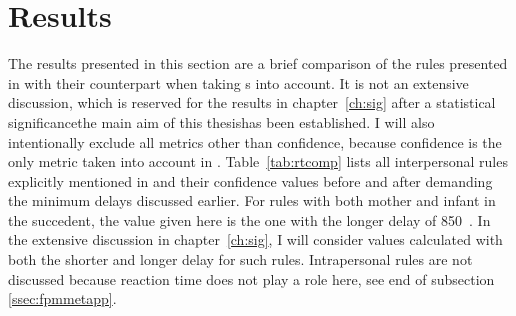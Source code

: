 \section{Results}
\label{sec:fpmres}
The results presented in this section are a brief comparison of the rules presented in \citet{rohlfing_multimodal_underreview} with their counterpart when taking \rt s into account.
It is not an extensive discussion, which is reserved for the results in chapter~\ref{ch:sig} after a statistical significance\dash the main aim of this thesis\dash has been established.
I will also intentionally exclude all metrics other than confidence, because confidence is the only metric taken into account in \citet{rohlfing_multimodal_underreview}.
Table~\ref{tab:rtcomp} lists all interpersonal rules explicitly mentioned in \citet{rohlfing_multimodal_underreview} and their confidence values before and after demanding the minimum delays discussed earlier.
For rules with both mother and infant in the succedent, the value given here is the one with the longer delay of 850~\ms.
In the extensive discussion in chapter~\ref{ch:sig}, I will consider values calculated with both the shorter and longer delay for such rules.
Intrapersonal rules are not discussed because reaction time does not play a role here, see end of subsection \ref{ssec:fpmmetapp}.

